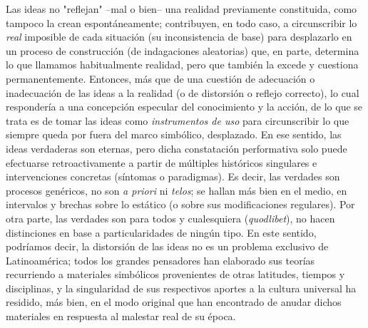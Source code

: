 \documentclass{book}
\begin{document}
Las ideas no "reflejan" --mal o bien-- una realidad previamente
constituida, como tampoco la crean espontáneamente; contribuyen, en todo
caso, a circunscribir lo \emph{real} imposible de cada situación (su
inconsistencia de base) para desplazarlo en un proceso de construcción
(de indagaciones aleatorias) que, en parte, determina lo que llamamos
habitualmente realidad, pero que también la excede y cuestiona
permanentemente. Entonces, más que de una cuestión de adecuación o
inadecuación de las ideas a la realidad (o de distorsión o reflejo
correcto), lo cual respondería a una concepción especular del
conocimiento y la acción, de lo que se trata es de tomar las ideas como
\emph{instrumentos de uso} para circunscribir lo que siempre queda por
fuera del marco simbólico, desplazado. En ese sentido, las ideas
verdaderas son eternas, pero dicha constatación performativa solo puede
efectuarse retroactivamente a partir de múltiples históricos singulares
e intervenciones concretas (síntomas o paradigmas). Es decir, las
verdades son procesos genéricos, no son \emph{a priori} ni \emph{telos};
se hallan más bien en el medio, en intervalos y brechas sobre lo
estático (o sobre sus modificaciones regulares). Por otra parte, las
verdades son para todos y cualesquiera (\emph{quodlibet}), no hacen
distinciones en base a particularidades de ningún tipo. En este sentido,
podríamos decir, la distorsión de las ideas no es un problema exclusivo
de Latinoamérica; todos los grandes pensadores han elaborado sus teorías
recurriendo a materiales simbólicos provenientes de otras latitudes,
tiempos y disciplinas, y la singularidad de sus respectivos aportes a la
cultura universal ha residido, más bien, en el modo original que han
encontrado de anudar dichos materiales en respuesta al malestar real de
su época.
\end{document}
